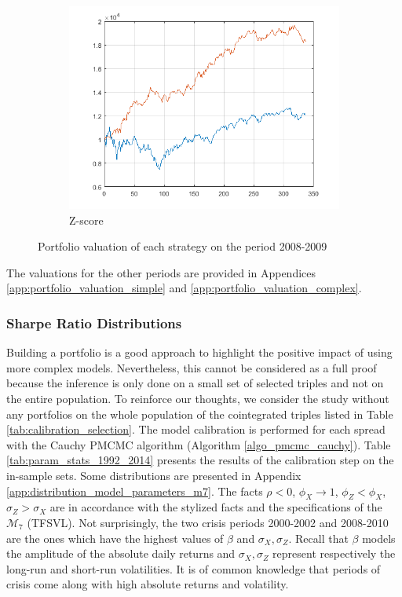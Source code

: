 \documentclass[11pt,a4,twosided,singlespacing,titlepagenumber=on]{scrreprt}
\numberwithin{equation}{chapter} %
\theoremstyle{remark}
\begin{document}
\begin{figure}[H]
\begin{subfigure}[t]{0.32\textwidth}
        \includegraphics[width=1\textwidth]{res/strats/zscore}
        \caption{Z-score}
    \end{subfigure}
    \caption{Portfolio valuation of each strategy on the period 2008-2009}
    \label{fig:portfolio_valuations}
\end{figure}

The valuations for the other periods are provided in Appendices \ref{app:portfolio_valuation_simple} and \ref{app:portfolio_valuation_complex}.

\subsubsection{Sharpe Ratio Distributions}
Building a portfolio is a good approach to highlight the positive impact of using more complex models. Nevertheless, this cannot be considered as a full proof because the inference is only done on a small set of selected triples and not on the entire population. To reinforce our thoughts, we consider the study without any portfolios on the whole population of the cointegrated triples listed in Table \ref{tab:calibration_selection}. The model calibration is performed for each spread with the Cauchy PMCMC algorithm (Algorithm \ref{algo_pmcmc_cauchy}). Table \ref{tab:param_stats_1992_2014} presents the results of the calibration step on the in-sample sets. Some distributions are presented in Appendix \ref{app:distribution_model_parameters_m7}. The facts $\rho < 0$, $\phi_X \rightarrow 1$, $\phi_Z<\phi_X$, $\sigma_Z > \sigma_X$ are in accordance with the stylized facts and the specifications of the $\mathcal{M}_7$ (TFSVL). Not surprisingly, the two crisis periods 2000-2002 and 2008-2010 are the ones which have the highest values of $\beta$ and $\sigma_X, \sigma_Z$. Recall that $\beta$ models the amplitude of the absolute daily returns and $\sigma_X, \sigma_Z$ represent respectively the long-run and short-run volatilities. It is of common knowledge that periods of crisis come along with high absolute returns and volatility. 
\end{document}
